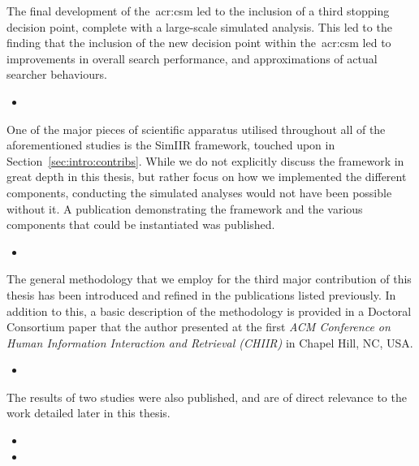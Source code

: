 The final development of the~\gls{acr:csm} led to the inclusion of a third stopping decision point, complete with a large-scale simulated analysis. This led to the finding that the inclusion of the new decision point within the~\gls{acr:csm} led to improvements in overall search performance, and approximations of actual searcher behaviours.

\begin{itemize}
    \item{}
\end{itemize}

\noindent
{}
One of the major pieces of scientific apparatus utilised throughout all of the aforementioned studies is the SimIIR framework, touched upon in Section~\ref{sec:intro:contribs}. While we do not explicitly discuss the framework in great depth in this thesis, but rather focus on how we implemented the different components, conducting the simulated analyses would not have been possible without it. A publication demonstrating the framework and the various components that could be instantiated was published.

\begin{itemize}
    \item{}
\end{itemize}

\noindent
{}
The general methodology that we employ for the third major contribution of this thesis has been introduced and refined in the publications listed previously. In addition to this, a basic description of the methodology is provided in a Doctoral Consortium paper that the author presented at the first \emph{ACM Conference on Human Information Interaction and Retrieval (CHIIR)} in Chapel Hill, NC, USA.

\begin{itemize}
    \item{}
\end{itemize}

The results of two studies were also published, and are of direct relevance to the work detailed later in this thesis.

\begin{itemize}
    \item{}
    \item{}
\end{itemize}

